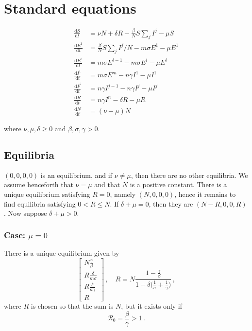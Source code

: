 \documentclass[fleqn]{article}
\begin{document}
\setlength{\parindent}{0in}
\setlength{\parskip}{0.2in}

\section{Standard equations}

\begin{subequations}
\begin{align}
  \frac{\text{d} S    }{\text{d} t}
  &= \nu N + \delta R - \frac{\beta}{N} S \sum\nolimits_{j} I^{j} - \mu S \\
  \frac{\text{d} E^{1}}{\text{d} t}
  &= \frac{\beta}{N} S \sum\nolimits_{j} I^{j} / N - m \sigma E^{1} - \mu E^{1} \\
  \frac{\text{d} E^{i}}{\text{d} t}
  &= m \sigma E^{i-1} - m \sigma E^{i} - \mu E^{i} \\
  \frac{\text{d} I^{1}}{\text{d} t}
  &= m \sigma E^{m} - n \gamma I^{1} - \mu I^{1} \\
  \frac{\text{d} I^{j}}{\text{d} t}
  &= n \gamma I^{j-1} - n \gamma I^{j} - \mu I^{j} \\
  \frac{\text{d} R    }{\text{d} t}
  &= n \gamma I^{n} - \delta R - \mu R \\
  \frac{\text{d} N    }{\text{d} t}
  &= (\nu - \mu) N
\end{align}
\end{subequations}

where $\nu,\mu,\delta \geq 0$ and $\beta,\sigma,\gamma > 0$.

\subsection{Equilibria}

$(0, 0, 0, 0)$ is an equilibrium, and if $\nu \neq \mu$,
then there are no other equilibria.
We assume henceforth that $\nu = \mu$ and that $N$ is a positive constant.
There is a unique equilibrium satisfying $R = 0$,
namely $(N, 0, 0, 0)$,
hence it remains to find equilibria satisfying $0 < R \leq N$.
If $\delta + \mu = 0$, then they are $(N - R, 0, 0, R)$.
Now suppose $\delta + \mu > 0$.

\subsubsection{Case: $\mu = 0$}

There is a unique equilibrium given by
\begin{equation}
\begin{bmatrix}
  N \frac{\gamma}{\beta} \\
  R \frac{\delta}{m \sigma} \\
  R \frac{\delta}{n \gamma} \\
  R
\end{bmatrix}
\,,\quad
R = N \frac{1 - \frac{\gamma}{\beta}}{1 + \delta \big(\frac{1}{\sigma} + \frac{1}{\gamma}\big)}\,,
\end{equation}
where $R$ is chosen so that the sum is $N$, but it exists only if
\begin{equation}
\mathcal{R}_{0} = \frac{\beta}{\gamma} > 1\,.
\end{equation}
\end{document}
